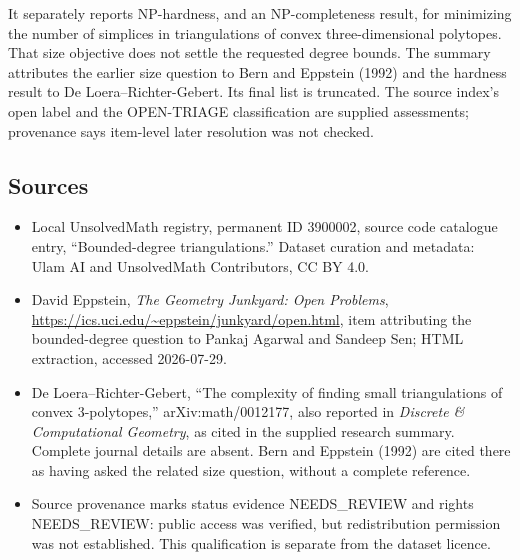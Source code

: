 \documentclass[11pt]{article}
\begin{document}
It separately reports NP-hardness, and an NP-completeness result, for minimizing the number of simplices in triangulations of convex three-dimensional polytopes. That size objective does not settle the requested degree bounds. The summary attributes the earlier size question to Bern and Eppstein (1992) and the hardness result to De Loera--Richter-Gebert. Its final list is truncated. The source index's open label and the OPEN-TRIAGE classification are supplied assessments; provenance says item-level later resolution was not checked.
\subsection{Sources}
\begin{itemize}
\item Local UnsolvedMath registry, permanent ID 3900002, source code catalogue entry, ``Bounded-degree triangulations.'' Dataset curation and metadata: Ulam AI and UnsolvedMath Contributors, CC BY 4.0.
\item David Eppstein, \emph{The Geometry Junkyard: Open Problems}, \url{https://ics.uci.edu/~eppstein/junkyard/open.html}, item attributing the bounded-degree question to Pankaj Agarwal and Sandeep Sen; HTML extraction, accessed 2026-07-29.
\item De Loera--Richter-Gebert, ``The complexity of finding small triangulations of convex 3-polytopes,'' arXiv:math/0012177, also reported in \emph{Discrete \& Computational Geometry}, as cited in the supplied research summary. Complete journal details are absent. Bern and Eppstein (1992) are cited there as having asked the related size question, without a complete reference.
\item Source provenance marks status evidence NEEDS\_REVIEW and rights NEEDS\_REVIEW: public access was verified, but redistribution permission was not established. This qualification is separate from the dataset licence.
\end{itemize}
\end{document}
